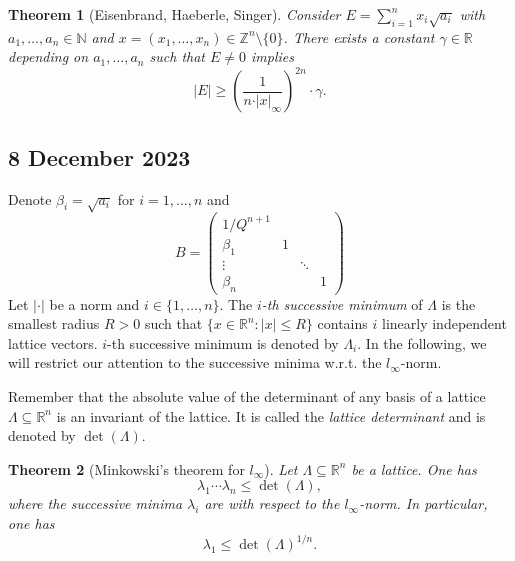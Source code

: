 \documentclass[a4paper,11pt,american]{article}
\newcommand{\N}{\mathbb{N}}
\newcommand{\R}{\mathbb{R}}
\newcommand{\Z}{\mathbb{Z}}
\theoremstyle{plain}
\newtheorem{theorem}{Theorem}
\theoremstyle{definition}
\begin{document}
 \begin{theorem}[Eisenbrand, Haeberle, Singer]
  \label{thr:6}
  Consider $ E = \sum_{i=1}^n x_i \sqrt{a_i}$ with  
  $a_1,\dots,a_n\in \N$  and  $x = (x_1,\dots,x_n)\in\Z^n\setminus\{0\}$. There exists a constant $\gamma \in \R$ depending on $a_1,\dots,a_n$ such that $E \neq0$ implies
  \begin{equation}
    \label{eq:12}
    \vert E\vert  \geq  \left( \frac{1}{n \cdot \vert x\vert _\infty}\right)^{2n} \cdot \gamma. 
  \end{equation}
\end{theorem}

\subsection*{8 December 2023}
Denote $\beta_i = \sqrt{a_i}$ for $i=1,\dots,n$ and 
 $$ B = 
   \begin{pmatrix}
     1/Q^{n+1} &  &  &   \\
     \beta_1      &  1            &        &   \\
     \vdots     &               & \ddots & \\
     \beta_n    &               &        & 1
   \end{pmatrix}
$$
 Let $\vert  \cdot\vert $ be a norm and $i \in \{1,\dots,n\}$. The \emph{$i$-th successive minimum} of $\Lambda$  is the smallest radius $R>0$ such that $\{ x \in \R^n : \vert x\vert \leq R\}$ contains $i$ linearly independent lattice vectors.  $i$-th successive minimum is denoted by $\Lambda_i$. In the following, we will restrict our attention to the successive minima w.r.t. the $l_\infty$-norm.

 Remember that the absolute value of the determinant of any basis of a lattice $\Lambda \subseteq \R^n$ is an invariant of the lattice. It is called the \emph{lattice determinant} and is denoted by $\det(\Lambda)$.

\begin{theorem}[Minkowski's theorem for $l_\infty$]
  \label{thr:8}
  Let $\Lambda \subseteq \R^n$ be a lattice. One has
  \begin{equation}
    \label{eq:13}
    \lambda_1 \cdots \lambda_n \leq \det(\Lambda), 
  \end{equation}
  where the successive minima $\lambda_i$ are with respect to the $l_\infty$-norm. 
  In particular, one has
  \begin{displaymath}
    \lambda_1 \leq \det(\Lambda)^{1/n}. 
  \end{displaymath}
\end{theorem}
\end{document}
